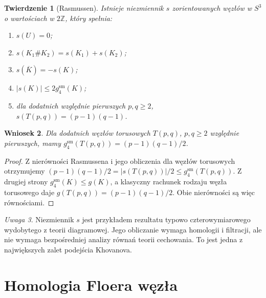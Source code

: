 \documentclass[11pt,a4paper]{report}
\numberwithin{equation}{section}
\theoremstyle{plain}
\newtheorem{twierdzenie}{Twierdzenie}[section]
\newtheorem{wniosek}[twierdzenie]{Wniosek}
\theoremstyle{definition}
\theoremstyle{remark}
\newtheorem{uwaga}[twierdzenie]{Uwaga}
\begin{document}
\begin{twierdzenie}[Rasmussen]
Istnieje niezmiennik $s$ zorientowanych węzłów w $S^3$
o wartościach w $2\mathbb Z$, który spełnia:
\begin{enumerate}[label=(\roman*)]
\item $s(U)=0$;
\item $s(K_1\#K_2)=s(K_1)+s(K_2)$;
\item $s(\overline K)=-s(K)$;
\item $|s(K)|\leq2g_4^{\mathrm{sm}}(K)$;
\item dla dodatnich względnie pierwszych $p,q\geq2$,
$s(T(p,q))=(p-1)(q-1)$.
\end{enumerate}
\end{twierdzenie}

\begin{wniosek}
Dla dodatnich węzłów torusowych $T(p,q)$,
$p,q\geq2$ względnie pierwszych, mamy
$g_4^{\mathrm{sm}}(T(p,q))=(p-1)(q-1)/2$.
\end{wniosek}

\begin{proof}
Z nierówności Rasmussena i jego obliczenia dla węzłów
torusowych otrzymujemy
$(p-1)(q-1)/2=|s(T(p,q))|/2\leq g_4^{\mathrm{sm}}(T(p,q))$.
Z drugiej strony $g_4^{\mathrm{sm}}(K)\leq g(K)$,
a klasyczny rachunek rodzaju węzła torusowego daje
$g(T(p,q))=(p-1)(q-1)/2$. Obie nierówności są więc
równościami.
\end{proof}

\begin{uwaga}
Niezmiennik $s$ jest przykładem rezultatu typowo
czterowymiarowego wydobytego z teorii diagramowej.
Jego obliczanie wymaga homologii i filtracji, ale nie
wymaga bezpośredniej analizy równań teorii cechowania.
To jest jedna z największych zalet podejścia Khovanova.
\end{uwaga}

\section{Homologia Floera węzła}
\label{sec:kt-hfk}
\end{document}
